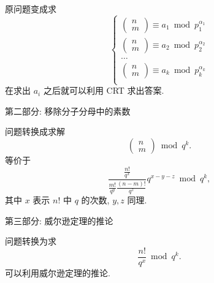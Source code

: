 \documentclass[UTF8, a4paper, titlepage, twoside]{ctexart}
\begin{document}
原问题变成求
\[
    \begin{cases}
        \left( \begin{array}{c} n \\ m \end{array} \right) \equiv a_1 \bmod p_1^{\alpha_1} \\
        \left( \begin{array}{c} n \\ m \end{array} \right) \equiv a_2 \bmod p_2^{\alpha_2} \\
        \dots                                                                              \\
        \left( \begin{array}{c} n \\ m \end{array} \right) \equiv a_k \bmod p_k^{\alpha_k} \\
    \end{cases}
\]
在求出 \(a_i\) 之后就可以利用 CRT 求出答案.

第二部分: 移除分子分母中的素数

问题转换成求解
\[
    \left(\begin{array}{c} n \\ m \end{array}\right) \bmod q^k.
\]
等价于
\[
    \frac{\frac{n!}{q^x}}{\frac{m!}{q^y}\frac{(n - m)!}{q^z}} q^{x - y - z} \bmod q^k,
\]
其中 \(x\) 表示 \(n!\) 中 \(q\) 的次数, \(y, z\) 同理.

第三部分: 威尔逊定理的推论

问题转换为求
\[
    \frac{n!}{q^x} \bmod q^k.
\]
可以利用威尔逊定理的推论.
\end{document}
